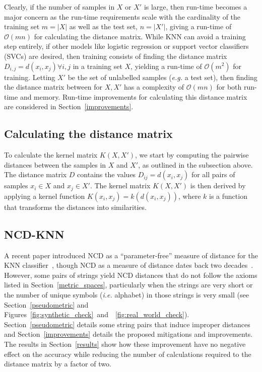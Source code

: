 \documentclass[preprint,12pt]{elsarticle}
\begin{document}
Clearly, if the number of samples in $X$ or $X'$ is large, then run-time becomes a major concern as the run-time requirements scale with the cardinality of the training set $m = | X | $ as well as the test set, $n = | X' |$, giving a run-time of $\mathcal{O}(mn)$ for calculating the distance matrix. 
While KNN can avoid a training step entirely, if other models like logistic regression or support vector classifiers (SVCs) are desired, then training consists of finding the distance matrix $D_{i,j} = d(x_i, x_j) \forall i,j$ in a training set $X$, yielding a run-time of $\mathcal{O}(m^2)$ for training. 
Letting $X'$ be the set of unlabelled samples (\textit{e.g.} a test set), then finding the distance matrix between for $X,X'$ has a complexity of  $\mathcal{O}(mn)$ for both run-time and memory. 
Run-time improvements for calculating this distance matrix are considered in Section~\ref{improvements}.

\subsection{Calculating the distance matrix}
\label{gram_matrix}

To calculate the kernel matrix $ K(X, X') $, we start by computing the pairwise distances between the samples in $ X $ and $ X' $, as outlined in the subsection above. 
The distance matrix $ D $ contains the values $ D_{ij} = d(x_i, x_j) $ for all pairs of samples $ x_i \in X $ and $ x_j \in X' $. The kernel matrix $ K(X, X') $ is then derived by applying a kernel function $ K(x_i, x_j) = k(d(x_i, x_j)) $, where $ k $ is a function that transforms the distances into similarities. 




\subsection{NCD-KNN}
\label{ncd-knn}

A recent paper introduced NCD as a ``parameter-free'' measure of distance for the KNN classifier~\cite{jiang2022less}, though NCD as a measure of distance dates back two decades~\cite{ncd}. 
However, some pairs of strings yield NCD distances that do not follow the axioms listed in Section~\ref{metric_spaces}, particularly when the strings are very short or the number of unique symbols (\textit{i.e.} alphabet) in those strings is very small (see Section~\ref{pseudometric} and Figures~\ref{fig:synthetic_check}~and~~\ref{fig:real_world_check}).
Section~\ref{pseudometric} details some string pairs that induce improper distances and Section~\ref{improvements} details the proposed mitigations and improvements.
The results in Section~\ref{results} show how these improvement have no negative effect on the accuracy while reducing the number of calculations required to the distance matrix by a factor of two.
\end{document}
